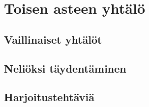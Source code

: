 \chapter{Toisen asteen yhtälö}

\section{Vaillinaiset yhtälöt}

\section{Neliöksi täydentäminen}

\section{Harjoitustehtäviä}
